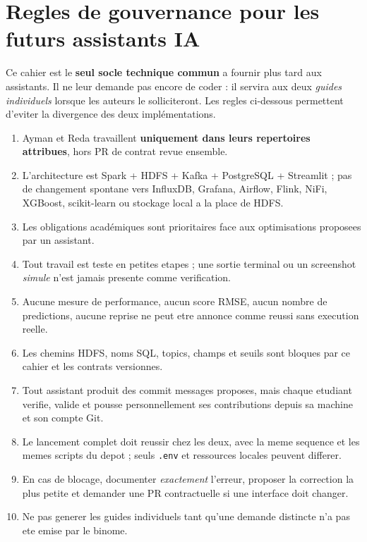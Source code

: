 \documentclass[10pt,a4paper]{article}
\newcommand{\code}[1]{{\small\ttfamily\nolinkurl{#1}}}
\begin{document}
\section{Regles de gouvernance pour les futurs assistants IA}
Ce cahier est le \textbf{seul socle technique commun} a fournir plus tard aux assistants. Il ne leur demande pas encore de coder : il servira aux deux \emph{guides individuels} lorsque les auteurs le solliciteront. Les regles ci-dessous permettent d'eviter la divergence des deux implémentations.
\begin{enumerate}
\item Ayman et Reda travaillent \textbf{uniquement dans leurs repertoires attribues}, hors PR de contrat revue ensemble.
\item L'architecture est Spark + HDFS + Kafka + PostgreSQL + Streamlit ; pas de changement spontane vers InfluxDB, Grafana, Airflow, Flink, NiFi, XGBoost, scikit-learn ou stockage local a la place de HDFS.
\item Les obligations académiques sont prioritaires face aux optimisations proposees par un assistant.
\item Tout travail est teste en petites etapes ; une sortie terminal ou un screenshot \emph{simule} n'est jamais presente comme verification.
\item Aucune mesure de performance, aucun score RMSE, aucun nombre de predictions, aucune reprise ne peut etre annonce comme reussi sans execution reelle.
\item Les chemins HDFS, noms SQL, topics, champs et seuils sont bloques par ce cahier et les contrats versionnes.
\item Tout assistant produit des commit messages proposes, mais chaque etudiant verifie, valide et pousse personnellement ses contributions depuis sa machine et son compte Git.
\item Le lancement complet doit reussir chez les deux, avec la meme sequence et les memes scripts du depot ; seuls \code{.env} et ressources locales peuvent differer.
\item En cas de blocage, documenter \emph{exactement} l'erreur, proposer la correction la plus petite et demander une PR contractuelle si une interface doit changer.
\item Ne pas generer les guides individuels tant qu'une demande distincte n'a pas ete emise par le binome.
\end{enumerate}
\end{document}
